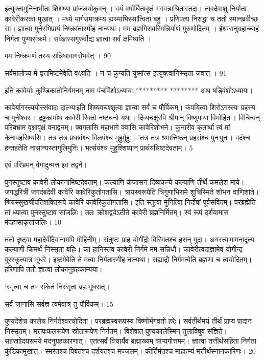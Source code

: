 इत्युक्तामुनिनाभीता शिशष्या प्रांजलयोकुवन् ।
वयं वर्षार्धितावृक्षं भगवन्नाश्रितास्तदा।
तावदेवाशु निर्याता कावेरीकरका मुखात् ।
मध्ये मार्गसमाक्रम्य ह्यस्माभिस्सांत्विता बहु ।
प्रणिपत्य निरुद्धा च ततो स्मानब्रवीच्छ सा।
ज्ञात्वा मुनेरभिप्रायं निष्क्रांतास्मीह नान्यथा।
मम ब्रह्मगिरावस्मिन्निर्याणं गुरुणोदितम् ।
ईश्वरानुग्रहाच्चाहं निर्गता पुण्यसंक्रमे।
सर्वज्ञस्सगुरुर्वोद्य ज्ञात्वा सर्वं क्षमिष्यति ।

मम निष्क्रमणं तस्य सन्निधावागसेभवेत् ।
90

सर्वमालोच्य मे वृत्तमिष्टमेवेति वक्ष्यति ।
न च कुप्यति युष्मांत्स
इत्युक्त्वानिस्सृता जवात् ।
91

इति कावेर्याः कुण्डिकातोनिर्गमनम् नाम
पंचविंशोऽध्यायः
*********
********
अथ षड्विंशोऽध्यायः।

कावेर्यागस्त्ययोस्संवादः दाल्भ्यःइति शिष्यवचश्शृत्वा ज्ञात्वा सर्वं च पौर्विकम्।
कंपयित्वा शिरोऽगस्त्यः प्रहस्य च मुनीश्वरः।
द्रष्ट्रकामोथ कावेरी रिक्तो नष्टधनो यथा।
दिव्यचक्षुरपि श्रीमान् विष्णुमाया विमोहितः।
विचिन्वन् परिबभ्राम वृक्षावृक्षं वनाद्वनम्।
क्वगतासि महाभागे क्वासि कावेरिशोभने।
कुनारीव कृतार्था त्वं मां केनापहसिष्यसि।
तत्र तत्र प्रधावंश्च विलपंश्च मुहुर्मुहुः।
'तत्र तत्र श्रमात्तिष्ठन् प्रहसंश्च पुनःपुनः।
वदंश्च हन्तहंतेति नासान्यस्तांगुलिमुनिः।
भर्त्सयंश्च मुहुश्शिष्यान् प्रार्थयन्निष्टदेवताम्।
5

एवं परिभ्रमन् वेगादुन्मत्त इव तद्वने।

पुनस्तुष्टाव कावेरी लोकानामिष्टदेवताम्।
कल्याणि कंजासन दिव्यकन्ये
कल्याणि तीर्थे कमलेश माये।
जगद्धरित्री जगदंबदेवी कावेरि कावेरिकुतोगतासि।
त्रायस्वरूपेति त्रिगुणाभिरामे
शुचिस्मिते शोभन वाणिशांते।
श्रियस्सुखश्रीपतिशक्तिरूपे
कावेरि कावेरिकुतोगतासि।
इति स्तुत्वा मुनित्विा निर्दोषां पूर्वसंविदम्।
परंब्रह्मेति तां ध्यात्वा पुनस्तुष्टाव सांजलिः।
ततः क्रोशद्वयेऽतीते कावेरी ब्रह्मनिर्मितम्।
स्वं रूपं दर्शयामास मंदहासाकृतांजलिः।
10

ततो दृष्ट्वा महादेवींदेवानामपि मोहिनीम्।
संतुष्टः प्राह योगींद्रो विस्मितश्च हसन् मुदा।
अगस्त्यःमामनादृत्य कल्याणी किमर्थं निस्सृता बहिः।
का हानिस्तव कावेरी निर्गमे मम सन्निधौ।
कावेरीत्वदाज्ञामेव योगीन्द्र पुरस्कृत्यात्र भूधरे।
इष्टमेवेति ते मत्वा निर्गतास्मीह नान्यथा।
सह्याद्रौ निर्गमन्वेति ब्रह्मणा च त्वयोदितम्।
हरिणापि ततो ज्ञात्वा लोकानुग्रहकाम्यया।

‘स्मृत्वा च तव संकेतं निस्सृता ब्रह्मभूधरात्।

सर्वं जानासि सर्वज्ञ त्वमेवात्र तु पौर्विकम्।
15

पुण्यदेशेच कालेच निर्गतेश्वरचोदिता।
परब्रह्मस्वरूपस्य विष्णोर्भगवतो हरेः।
सर्वतीर्थमयं तीर्थं प्राप्य पादान निस्सृतम्।
मत्तपःफलरूपेण स्रोतारूपेण निर्गतम्।
विशेषात् पुण्यकालेस्मिन् तुलाविषुव संज्ञिते।
सहस्राोदयसमये मदनुग्रहकारणात्।
एतत्सर्वं विचार्यैव ब्रह्माख्यम् चाप्यगोत्तमम्।
ज्ञात्वा तत्तीर्थसहिता निर्गता कुंडिकामुखात्।
स्मरंतश्च पिबंतश्च दर्शयंतश्च मज्जलम्।
कीर्तिमंतश्च माहात्म्यं मत्तीर्थस्नानकारिणः।
20

